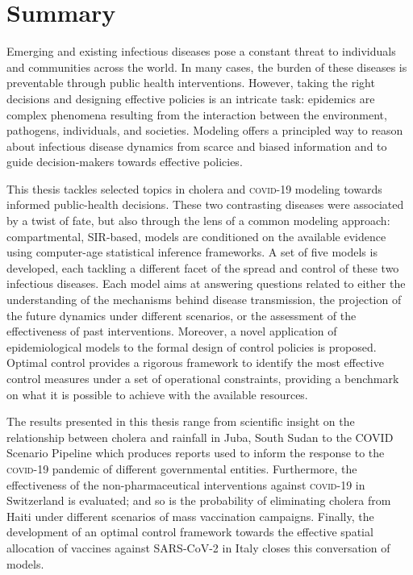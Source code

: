  \chapter*{Summary} %
\vspace{-.5cm}
Emerging and existing infectious diseases pose a constant threat to individuals and communities across the world. In many cases, the burden of these diseases is preventable through public health interventions. However, taking the right decisions and designing effective policies is an intricate task: epidemics are complex phenomena resulting from the interaction between the environment, pathogens, individuals, and societies. Modeling offers a principled way to reason about infectious disease dynamics from scarce and biased information and to guide decision-makers towards effective policies. 

This thesis tackles selected topics in cholera and \textsc{covid}-19 modeling towards informed public-health decisions. These two contrasting diseases were associated by a twist of fate, but also through the lens of a common modeling approach:   compartmental, SIR-based, models are conditioned on the available evidence using computer-age statistical inference frameworks. A set of five models is developed, each tackling a different facet of the spread and control of these two infectious diseases. Each model aims at answering questions related to either the understanding of the mechanisms behind disease transmission, the projection of the future dynamics under different scenarios, or the assessment of the effectiveness of past interventions. Moreover, a novel application of epidemiological models to the formal design of control policies is proposed. Optimal control provides a rigorous framework to identify the most effective control measures under a set of operational constraints, providing a benchmark on what it is possible to achieve with the available resources.

The results presented in this thesis range from scientific insight on the relationship between cholera and rainfall in Juba, South Sudan to the COVID Scenario Pipeline which produces reports used to inform the response to the \textsc{covid}-19 pandemic of different governmental entities. Furthermore, the effectiveness of the non-pharmaceutical interventions against \textsc{covid}-19 in Switzerland is evaluated; and so is the probability of eliminating cholera from Haiti under different scenarios of mass vaccination campaigns. Finally, the development of an optimal control framework towards the effective spatial allocation of vaccines against SARS-CoV-2 in Italy closes this conversation of models.


